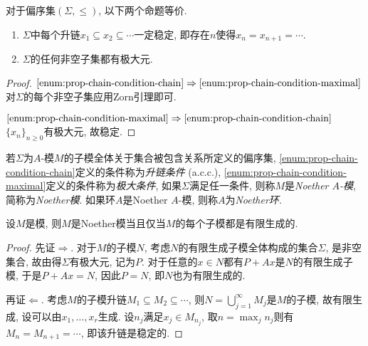 \begin{proposition}\label{prop:chaincondition}
  对于偏序集$(\Sigma, \leq)$, 以下两个命题等价.
  \begin{enumerate}
    \item\label{enum:prop-chain-condition-chain} $\Sigma$中每个升链$x_1\subseteq x_2\subseteq\dotsb$一定稳定, 即存在$n$使得$x_n=x_{n+1}=\dotsb$.
    \item\label{enum:prop-chain-condition-maximal} $\Sigma$的任何非空子集都有极大元.
  \end{enumerate}
\end{proposition}

\begin{proof}
  $\ref{enum:prop-chain-condition-chain}\Rightarrow\ref{enum:prop-chain-condition-maximal}$ 对$\Sigma$的每个非空子集应用Zorn引理即可.

  $\ref{enum:prop-chain-condition-maximal}\Rightarrow\ref{enum:prop-chain-condition-chain}$ $\{x_n\}_{n\geq 0}$有极大元, 故稳定.
\end{proof}

\begin{definition}
  若$\Sigma$为$A$-模$M$的子模全体关于集合被包含关系所定义的偏序集, \ref{enum:prop-chain-condition-chain}定义的条件称为\emph{升链条件} (a.c.c.), \ref{enum:prop-chain-condition-maximal}定义的条件称为\emph{极大条件}, 如果$\Sigma$满足任一条件, 则称$M$是\emph{Noether $A$-模}, 简称为\emph{Noether模}. 如果环$A$是Noether $A$-模, 则称$A$为\emph{Noether环}.
\end{definition}

\begin{proposition}\label{prop:noethermodule}
  设$M$是模, 则$M$是Noether模当且仅当$M$的每个子模都是有限生成的.
\end{proposition}

\begin{proof}
  先证$\Rightarrow$. 对于$M$的子模$N$, 考虑$N$的有限生成子模全体构成的集合$\Sigma$, 是非空集合, 故由得$\Sigma$有极大元, 记为$P$. 对于任意的$x\in N$都有$P+Ax$是$N$的有限生成子模, 于是$P+Ax=N$, 因此$P=N$, 即$N$也为有限生成的.

  再证$\Leftarrow$. 考虑$M$的子模升链$M_1\subseteq M_2\subseteq \dotsb$, 则$N=\bigcup_{j=1}^\infty M_j$是$M$的子模, 故有限生成, 设可以由$x_1, \dotsc, x_r$生成. 设$n_j$满足$x_j\in M_{n_j}$, 取$n=\max_j n_j$则有$M_n=M_{n+1}=\dotsb$, 即该升链是稳定的.
\end{proof}

